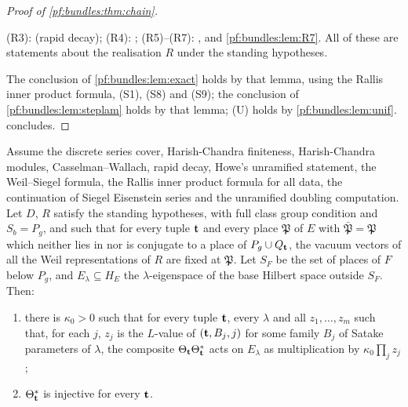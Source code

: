 \begin{proof}[Proof of \cref{pf:bundles:thm:chain}]
\begin{itemize}
(R3):  (rapid decay); (R4):
; (R5)--(R7): ,
 and \cref{pf:bundles:lem:R7}.
All of these are statements about the realisation $R$ under the standing hypotheses.
\end{itemize}
The conclusion of \cref{pf:bundles:lem:exact} holds by that lemma, using the Rallis inner product formula, (S1), (S8) and (S9); the conclusion of
\cref{pf:bundles:lem:steplam} holds by that lemma; (U) holds by \cref{pf:bundles:lem:unif}.  concludes.
\end{proof}

\begin{corollary}\label{pf:bundles:cor:bform}
Assume the discrete series cover, Harish-Chandra finiteness, Harish-Chandra modules, Casselman--Wallach, rapid decay, Howe's unramified
statement, the Weil--Siegel formula, the Rallis inner product formula for all data, the continuation of Siegel Eisenstein series and the unramified
doubling computation. Let $D$, $R$ satisfy the standing hypotheses, with full class group condition and $S_b=P_g$, and such that for every tuple $\mathbf t$ and every
place $\mathfrak P$ of $E$ with $\bar{\mathfrak P}=\mathfrak P$ which neither lies in nor is conjugate to a place of $P_g\cup Q_\mathbf t$, the vacuum
vectors of all the Weil representations of $R$ are fixed at $\mathfrak P$. Let $S_F$ be the set of places of $F$ below $P_g$, and
$E_\lambda\subseteq H_E$ the $\lambda$-eigenspace of the base Hilbert space outside $S_F$. Then:
\begin{enumerate}[label=(\alph*)]
\item there is $\kappa_0>0$ such that for every tuple $\mathbf t$, every $\lambda$ and all $z_1,\dots,z_m$ such that, for each $j$, $z_j$ is the
$L$-value of $(\mathbf t,B_j,j)$ for some family $B_j$ of Satake parameters of $\lambda$, the composite $\Theta_\mathbf t\Theta_\mathbf t^*$ acts on
$E_\lambda$ as multiplication by $\kappa_0\prod_jz_j$;
\item $\Theta_\mathbf t^*$ is injective for every $\mathbf t$.
\end{enumerate}
\end{corollary}

